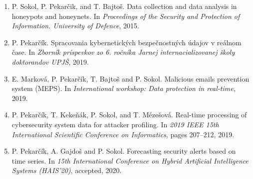 \documentclass[thesismargins, thesislinespacing, openright, upjsfrontpage, combineabstracts]{rnthesis}
\begin{document}
\begin{enumerate}
\item P. Sokol, P. Pekarčik, and T. Bajtoš. Data collection and data analysis in honeypots and honeynets. In \textit{Proceedings of the Security and Protection of Information. University of Defence}, 2015.

\item P. Pekarčík. Spracovania kybernetických bezpečnostných údajov v reálnom čase. In \textit{Zborník príspevkov zo 6. ročníka Jarnej internacializovanej školy doktorandov UPJŠ}, 2019.

\item E. Marková, P. Pekarčík, T. Bajtoš and P. Sokol. Malicious emails prevention system (MEPS). In \textit{International workshop: Data protection in real-time}, 2019.

\item P. Pekarčík, T. Kekeňák, P. Sokol, and T. Mézešová. Real-time processing of cybersecurity system data for attacker profiling. In \textit{2019 IEEE 15th International Scientific Conference on Informatics}, pages 207–212, 2019.

\item P. Pekarčík, A. Gajdoš and P. Sokol. Forecasting security alerts based on time series. In \textit{15th International Conference on Hybrid Artificial Intelligence Systems (HAIS’20)}, accepted, 2020.


\end{enumerate}
\end{document}
